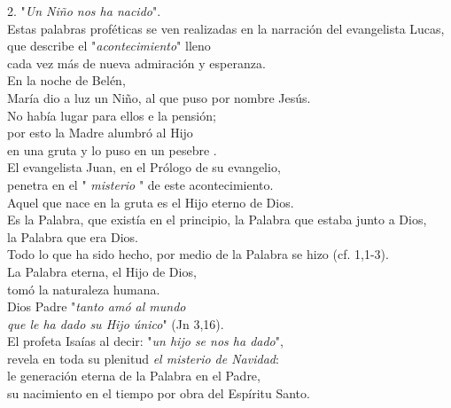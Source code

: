 2. "\emph{Un Niño nos ha nacido}".\\
Estas palabras proféticas se ven realizadas en la narración del
evangelista Lucas,~\\
que describe el "\emph{acontecimiento}" lleno\\
cada vez más de nueva admiración y esperanza.\\
En la noche de Belén,\\
María dio a luz un Niño, al que puso por nombre Jesús.\\
No había lugar para ellos e la pensión;\\
por esto la Madre alumbró al Hijo\\
en una gruta y lo puso en un pesebre .\\
El evangelista Juan, en el Prólogo de su evangelio,\\
penetra en el " \emph{misterio} " de este acontecimiento.\\
Aquel que nace en la gruta es el Hijo eterno de Dios.\\
Es la Palabra, que existía en el principio, la Palabra que estaba junto
a Dios,\\
la Palabra que era Dios.\\
Todo lo que ha sido hecho, por medio de la Palabra se hizo (cf.
1,1-3).\\
La Palabra eterna, el Hijo de Dios,\\
tomó la naturaleza humana.\\
Dios Padre "\emph{tanto amó al mundo\\
	que le ha dado su Hijo único}" (Jn 3,16).\\
El profeta Isaías al decir: "\emph{un hijo se nos ha dado}",\\
revela en toda su plenitud \emph{el misterio de Navidad}:\\
le generación eterna de la Palabra en el Padre,\\
su nacimiento en el tiempo por obra del Espíritu Santo.

